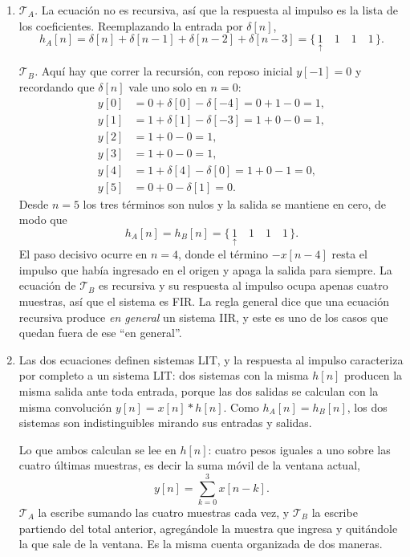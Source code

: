 \documentclass[10pt,a4paper]{article}
\begin{document}
	\begin{enumerate}
		\item \emph{$\mathcal{T}_A$.} La ecuación no es recursiva, así que la respuesta al impulso
		es la lista de los coeficientes. Reemplazando la entrada por $\delta[n]$,
		\[
			h_A[n] = \delta[n]+\delta[n-1]+\delta[n-2]+\delta[n-3]
			       = \{\, \underset{\uparrow}{1} \quad 1 \quad 1 \quad 1 \,\}.
		\]

		\emph{$\mathcal{T}_B$.} Aquí hay que correr la recursión, con reposo inicial
		$y[-1]=0$ y recordando que $\delta[n]$ vale uno solo en $n=0$:
		\[
			\begin{aligned}
			y[0] &= 0 + \delta[0] - \delta[-4] = 0 + 1 - 0 = 1, \\
			y[1] &= 1 + \delta[1] - \delta[-3] = 1 + 0 - 0 = 1, \\
			y[2] &= 1 + 0 - 0 = 1, \\
			y[3] &= 1 + 0 - 0 = 1, \\
			y[4] &= 1 + \delta[4] - \delta[0] = 1 + 0 - 1 = 0, \\
			y[5] &= 0 + 0 - \delta[1] = 0.
			\end{aligned}
		\]
		Desde $n=5$ los tres términos son nulos y la salida se mantiene en cero, de modo que
		\[
			\boxed{\;h_A[n] = h_B[n] = \{\, \underset{\uparrow}{1} \quad 1 \quad 1 \quad 1 \,\}.\;}
		\]
		El paso decisivo ocurre en $n=4$, donde el término $-x[n-4]$ resta el impulso que
		había ingresado en el origen y apaga la salida para siempre. La ecuación de
		$\mathcal{T}_B$ es recursiva y su respuesta al impulso ocupa apenas cuatro muestras,
		así que el sistema es FIR. La regla general dice que una ecuación recursiva produce
		\emph{en general} un sistema IIR, y este es uno de los casos que quedan fuera de ese
		``en general''.

		\item Las dos ecuaciones definen sistemas LIT, y la
		respuesta al impulso caracteriza por completo a un sistema LIT: dos sistemas con la
		misma $h[n]$ producen la misma salida ante toda entrada, porque las dos salidas se
		calculan con la misma convolución $y[n]=x[n]*h[n]$. Como $h_A[n]=h_B[n]$, los dos
		sistemas son indistinguibles mirando sus entradas y salidas.

		Lo que ambos calculan se lee en $h[n]$: cuatro pesos iguales a uno sobre las cuatro
		últimas muestras, es decir la suma móvil de la ventana actual,
		\[
			y[n] = \sum_{k=0}^{3} x[n-k].
		\]
		$\mathcal{T}_A$ la escribe sumando las cuatro muestras cada vez, y $\mathcal{T}_B$ la
		escribe partiendo del total anterior, agregándole la muestra que ingresa y quitándole
		la que sale de la ventana. Es la misma cuenta organizada de dos maneras.


\end{enumerate}
\end{document}
